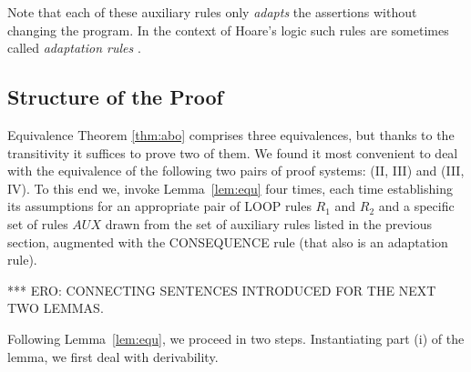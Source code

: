 \documentclass[manuscript, screen, review]{acmart}
\newcommand{\AUX}{\mathit{AUX}}
\begin{document}
\III




Note that each of these auxiliary rules only \emph{adapts} the assertions without changing the program.
In the context of Hoare's logic such rules are sometimes called \emph{adaptation rules}
\cite{Hoa71,Old83,GR16}.



\subsection{Structure of the Proof}
\label{subsec:structure}

Equivalence Theorem \ref{thm:abo} comprises three equivalences, but
thanks to the transitivity it suffices to prove two of them. We found
it most convenient to deal with the equivalence of the following two
pairs of proof systems: (II, III) and (III, IV). To this end we,
invoke Lemma~\ref{lem:equ} four times, each time establishing its
assumptions for an appropriate pair of LOOP rules $R_1$ and $R_2$ and
a specific set of rules $\AUX$ drawn from the set of auxiliary rules
listed in the previous section, augmented with the CONSEQUENCE rule
(that also is an adaptation rule).

\III
\NI
*** ERO: CONNECTING SENTENCES INTRODUCED FOR THE NEXT TWO LEMMAS.

Following Lemma~\ref{lem:equ}, we proceed in two steps.
Instantiating part (i) of the lemma, we first deal with derivability.

\end{document}

